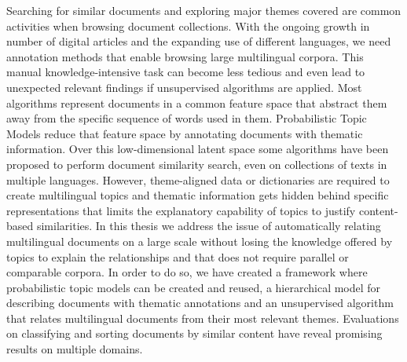 


\begin{abstractslong}  
Searching for similar documents and exploring major themes covered are common activities when browsing document collections. With the ongoing growth in number of digital articles and the expanding use of different languages, we need annotation methods that enable browsing large multilingual corpora. This manual knowledge-intensive task can become less tedious and even lead to unexpected relevant findings if unsupervised algorithms are applied. Most  algorithms represent documents in a common feature space that abstract them away from the specific sequence of words used in them. Probabilistic Topic Models reduce that feature space by annotating documents with thematic information. Over this low-dimensional latent space some algorithms have been proposed to perform document similarity search, even on collections of texts in multiple languages. However, theme-aligned data or dictionaries are required to create multilingual topics and thematic information gets hidden behind specific representations that limits the explanatory capability of topics to justify content-based similarities. In this thesis we address the issue of automatically relating multilingual documents on a large scale without losing the knowledge offered by topics to explain the relationships and that does not require parallel or comparable corpora. In order to do so, we have created a framework where probabilistic topic models can be created and reused, a hierarchical model for describing documents with thematic annotations and an unsupervised algorithm that relates multilingual documents from their most relevant themes. Evaluations on classifying and sorting documents by similar content have reveal promising results on multiple domains.


\end{abstractslong}

